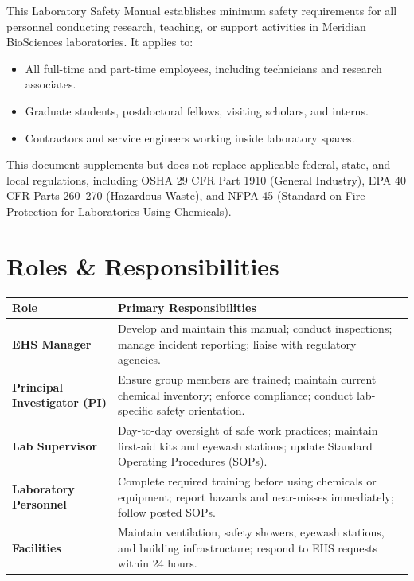 \documentclass[11pt,a4paper]{article}
\begin{document}
This Laboratory Safety Manual establishes minimum safety requirements for all personnel
conducting research, teaching, or support activities in Meridian BioSciences laboratories.
It applies to:

\begin{itemize}[noitemsep, topsep=2pt, leftmargin=1.4em]
  \item All full-time and part-time employees, including technicians and research associates.
  \item Graduate students, postdoctoral fellows, visiting scholars, and interns.
  \item Contractors and service engineers working inside laboratory spaces.
\end{itemize}

This document supplements but does not replace applicable federal, state, and local regulations,
including OSHA 29 CFR Part 1910 (General Industry), EPA 40 CFR Parts 260--270 (Hazardous
Waste), and NFPA 45 (Standard on Fire Protection for Laboratories Using Chemicals).

\section{Roles \& Responsibilities}

\begin{tabularx}{\linewidth}{@{}>{\color{accent}\bfseries}l@{\hspace{8mm}}>{\raggedright\arraybackslash}X@{}}
  \toprule
  Role & Primary Responsibilities \\
  \midrule
  EHS Manager         & Develop and maintain this manual; conduct inspections; manage incident
                        reporting; liaise with regulatory agencies. \\[4pt]
  Principal Investigator (PI) & Ensure group members are trained; maintain current chemical
                        inventory; enforce compliance; conduct lab-specific safety orientation. \\[4pt]
  Lab Supervisor      & Day-to-day oversight of safe work practices; maintain first-aid kits
                        and eyewash stations; update Standard Operating Procedures (SOPs). \\[4pt]
  Laboratory Personnel & Complete required training before using chemicals or equipment; report
                        hazards and near-misses immediately; follow posted SOPs. \\[4pt]
  Facilities          & Maintain ventilation, safety showers, eyewash stations, and building
                        infrastructure; respond to EHS requests within 24 hours. \\
  \bottomrule
\end{tabularx}
\end{document}
